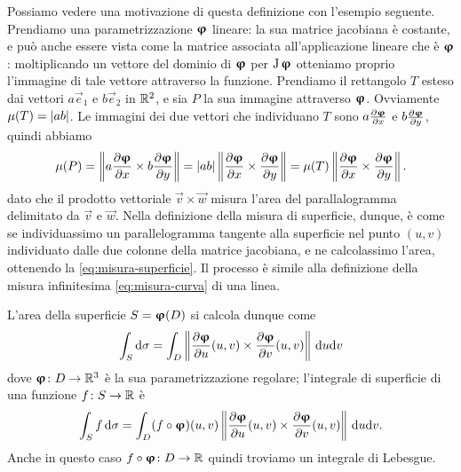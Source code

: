 Possiamo vedere una motivazione di questa definizione con l'esempio seguente.
Prendiamo una parametrizzazione $\bm{\upvarphi}$ lineare: la sua matrice jacobiana è costante, e può anche essere vista come la matrice associata all'applicazione lineare che è $\bm{\upvarphi}$: moltiplicando un vettore del dominio di $\bm{\upvarphi}$ per $\operatorname{J}{\bm{\upvarphi}}$ otteniamo proprio l'immagine di tale vettore attraverso la funzione.
Prendiamo il rettangolo $T$ esteso dai vettori $a\vec e_1$ e $b\vec e_2$ in $\mathbb{R}^2$, e sia $P$ la sua immagine attraverso $\bm{\upvarphi}$.
Ovviamente $\mu(T)=\left|{ab}\right|$.
Le immagini dei due vettori che individuano $T$ sono $a\frac{\partial {\bm{\upvarphi}}}{\partial {x}}$ e $b\frac{\partial {\bm{\upvarphi}}}{\partial {y}}$, quindi abbiamo
\begin{equation*}
	\mu(P)=\left\|{a\frac{\partial {\bm{\upvarphi}}}{\partial {x}}\times b\frac{\partial {\bm{\upvarphi}}}{\partial {y}}}\right\|=\left|{ab}\right|\left\|{\frac{\partial {\bm{\upvarphi}}}{\partial {x}}\times\frac{\partial {\bm{\upvarphi}}}{\partial {y}}}\right\|=\mu(T)\left\|{\frac{\partial {\bm{\upvarphi}}}{\partial {x}}\times\frac{\partial {\bm{\upvarphi}}}{\partial {y}}}\right\|.
\end{equation*}
dato che il prodotto vettoriale $\vec v\times\vec w$ misura l'area del parallalogramma delimitato da $\vec v$ e $\vec w$.
Nella definizione della misura di superficie, dunque, è come se individuassimo un parallelogramma tangente alla superficie nel punto $(u,v)$ individuato dalle due colonne della matrice jacobiana, e ne calcolassimo l'area, ottenendo la \eqref{eq:misura-superficie}.
Il processo è simile alla definizione della misura infinitesima \eqref{eq:misura-curva} di una linea.

L'area della superficie $S=\bm{\upvarphi}(D)$ si calcola dunque come
\begin{equation}
	\int_S\textup{d}\sigma=\int_D\left\|{\frac{\partial {\bm{\upvarphi}}}{\partial {u}}(u,v)\times\frac{\partial {\bm{\upvarphi}}}{\partial {v}}(u,v)}\right\|\,\textup{d} u\textup{d} v
\end{equation}
dove $\bm{\upvarphi}\colon D\to\mathbb{R}^3$ è la sua parametrizzazione regolare; l'integrale di superficie di una funzione $f\colon S\to\mathbb{R}$ è
\begin{equation}
	\int_Sf\,\textup{d}\sigma=\int_D(f\circ\bm{\upvarphi})(u,v)\left\|{\frac{\partial {\bm{\upvarphi}}}{\partial {u}}(u,v)\times\frac{\partial {\bm{\upvarphi}}}{\partial {v}}(u,v)}\right\|\,\textup{d} u\textup{d} v.
\end{equation}
Anche in questo caso $f\circ\bm{\upvarphi}\colon D\to\mathbb{R}$ quindi troviamo un integrale di Lebesgue.

